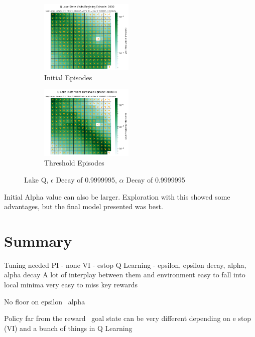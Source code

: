 \documentclass[letterpaper]{article} %
\begin{document}
\begin{figure}[!htb]
	\begin{subfigure}[b]{0.25\textwidth}
		\centering
		\includegraphics[width=1.75in]{Figures/Q_Lake_State_Visits_Begining_Episode__2000_Map_Large__Gamma_0_9__E_Dec_0_9999995__Alpha_0_1__A_Dec_0_9999995__Is_Slippery.png}
		\caption{Initial Episodes}
  	\end{subfigure}%
	\begin{subfigure}[b]{0.25\textwidth}
		\centering
		\includegraphics[width=1.75in]{Figures/Q_Lake_State_Visits_Threshold_Episode__80000_0_Map_Large__Gamma_0_9__E_Dec_0_9999995__Alpha_0_1__A_Dec_0_9999995__Is_Slippery.png}
		\caption{Threshold Episodes}
  	\end{subfigure}%
\caption{Lake Q,  $\epsilon$ Decay of 0.9999995, $\alpha$ Decay of 0.9999995}
\label{fig:lake_q_e_9999995_a_9999995_maps}
\end{figure}




Initial Alpha value can also be larger.  Exploration with this showed some advantages, but the final model presented was best.



\section{Summary}
Tuning needed
PI - none
VI - estop
Q Learning - epsilon, epsilon decay, alpha, alpha decay
A lot of interplay between them and environment
easy to fall into local minima
very easy to miss key rewards

No floor on epsilon \ alpha

Policy far from the reward \ goal state can be very different depending on e stop (VI) and a bunch of things in Q Learning
\end{document}
